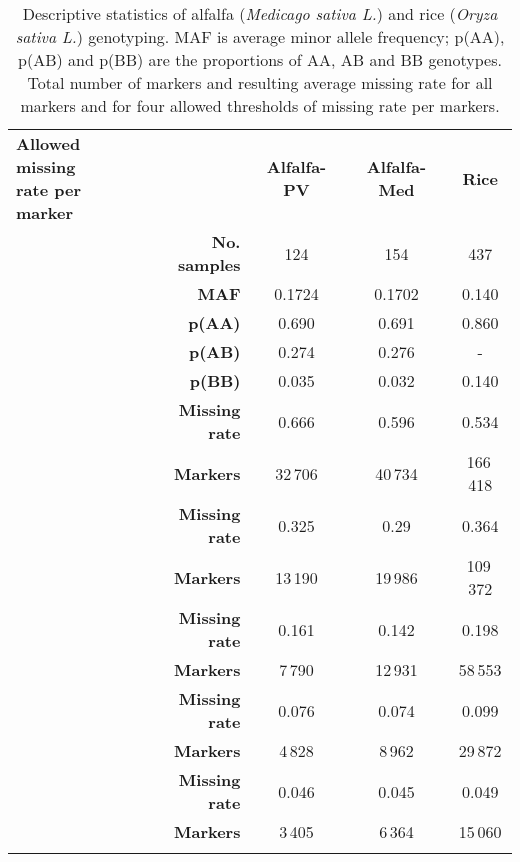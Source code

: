 \newcommand{\specialcell}[2][c]{%
  \begin{tabular}[#1]{@{}c@{}}#2\end{tabular}}

\begin{table}
\centering
\caption[Descriptive statistics, markers counts, and missing rates]{
Descriptive statistics of alfalfa (\emph{Medicago sativa L.}) 
and rice (\emph{Oryza sativa L.}) genotyping. MAF is average minor allele frequency; 
p(AA), p(AB) and p(BB) are the proportions of AA, AB and BB genotypes.
Total number of markers and resulting average missing rate for all markers
and for four allowed thresholds of missing rate per markers.}
\label{tab:missing_rates}
\begin{tabular}{C{3cm}rccc}
\hline\noalign{\smallskip}
\specialcell{\textbf{Allowed missing}\\ \textbf{rate per marker}}  & & \textbf{Alfalfa-PV} & \textbf{Alfalfa-Med} & \textbf{Rice}\\
\noalign{\smallskip}\Xhline{3\arrayrulewidth}\noalign{\smallskip}
  & \textbf{No. samples}  & 124     & 154       & 437\\
                        & \textbf{MAF}          & 0.1724  & 0.1702    & 0.140 \\
                        & \textbf{p(AA)}        & 0.690   & 0.691     & 0.860\\
                        & \textbf{p(AB)}        & 0.274   & 0.276     & -\\
                        & \textbf{p(BB)}        & 0.035   & 0.032     & 0.140\\
                        & \textbf{Missing rate} & 0.666   & 0.596     & 0.534\\
                        & \textbf{Markers}      & 32\,706 & 40\,734   & 166\,418\\    
\noalign{\smallskip}\hline\noalign{\smallskip}
      & \textbf{Missing rate} &  0.325 & 0.29  & 0.364\\
                           & \textbf{Markers}      & 13\,190  & 19\,986 & 109\,372\\    
\noalign{\smallskip}\hline\noalign{\smallskip}
      & \textbf{Missing rate} &  0.161 & 0.142 & 0.198\\
                           & \textbf{Markers}      & 7\,790 & 12\,931 & 58\,553\\    
\noalign{\smallskip}\hline\noalign{\smallskip}
      & \textbf{Missing rate} & 0.076 & 0.074 & 0.099\\
                           & \textbf{Markers}      & 4\,828 & 8\,962 & 29\,872\\
\noalign{\smallskip}\hline\noalign{\smallskip}
      & \textbf{Missing rate} & 0.046 & 0.045 & 0.049\\
                           & \textbf{Markers}      & 3\,405 & 6\,364 & 15\,060 \\
\noalign{\smallskip}\hline
\end{tabular}
\end{table}
